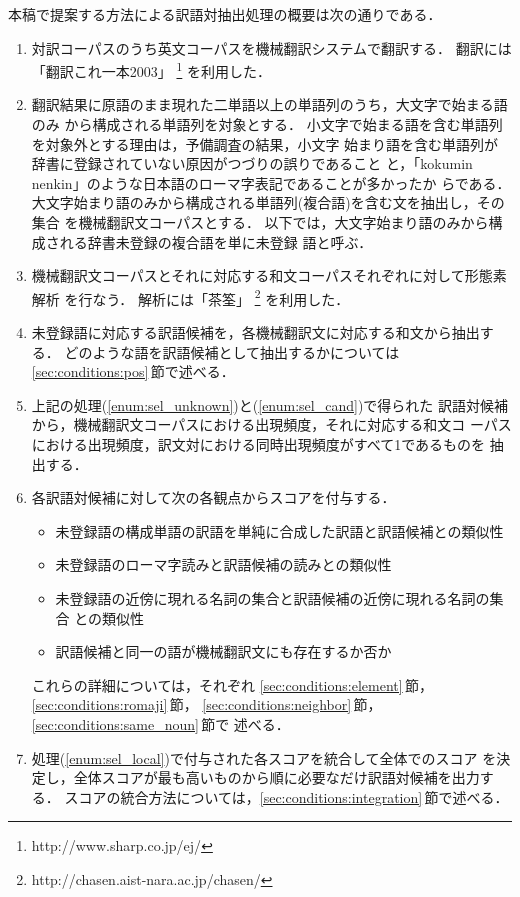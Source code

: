 本稿で提案する方法による訳語対抽出処理の概要は次の通りである．
\begin{enumerate}
\item \label{enum:mt}
対訳コーパスのうち英文コーパスを機械翻訳システムで翻訳する．
翻訳には「翻訳これ一本2003」
\footnote{ http://www.sharp.co.jp/ej/}
を利用した．
\item \label{enum:sel_unknown}
翻訳結果に原語のまま現れた二単語以上の単語列のうち，大文字で始まる語のみ
から構成される単語列を対象とする．
小文字で始まる語を含む単語列を対象外とする理由は，予備調査の結果，小文字
始まり語を含む単語列が辞書に登録されていない原因がつづりの誤りであること
と，「kokumin nenkin」のような日本語のローマ字表記であることが多かったか
らである． 
大文字始まり語のみから構成される単語列(複合語)を含む文を抽出し，その集合
を機械翻訳文コーパスとする．
以下では，大文字始まり語のみから構成される辞書未登録の複合語を単に未登録
語と呼ぶ．
\item \label{enum:morph}
機械翻訳文コーパスとそれに対応する和文コーパスそれぞれに対して形態素解析
を行なう．
解析には「茶筌」
\footnote{http://chasen.aist-nara.ac.jp/chasen/}
を利用した．
\item \label{enum:sel_cand}
未登録語に対応する訳語候補を，各機械翻訳文に対応する和文から抽出する．
どのような語を訳語候補として抽出するかについては
\ref{sec:conditions:pos}\,節で述べる． 
\item \label{enum:sel_low_freq}
上記の処理(\ref{enum:sel_unknown})と(\ref{enum:sel_cand})で得られた
訳語対候補から，機械翻訳文コーパスにおける出現頻度，それに対応する和文コ
ーパスにおける出現頻度，訳文対における同時出現頻度がすべて1であるものを
抽出する．
\item \label{enum:sel_local}
各訳語対候補に対して次の各観点からスコアを付与する．
\begin{itemize}
\item 未登録語の構成単語の訳語を単純に合成した訳語と訳語候補との類似性
\item 未登録語のローマ字読みと訳語候補の読みとの類似性
\item 未登録語の近傍に現れる名詞の集合と訳語候補の近傍に現れる名詞の集合
との類似性
\item 訳語候補と同一の語が機械翻訳文にも存在するか否か
\end{itemize}
これらの詳細については，それぞれ
\ref{sec:conditions:element}\,節，\ref{sec:conditions:romaji}\,節，
\ref{sec:conditions:neighbor}\,節，\ref{sec:conditions:same_noun}\,節で
述べる．
\item \label{enum:sel_global}
処理(\ref{enum:sel_local})で付与された各スコアを統合して全体でのスコア
を決定し，全体スコアが最も高いものから順に必要なだけ訳語対候補を出力する．
スコアの統合方法については，\ref{sec:conditions:integration}\,節で述べる．
\end{enumerate}


